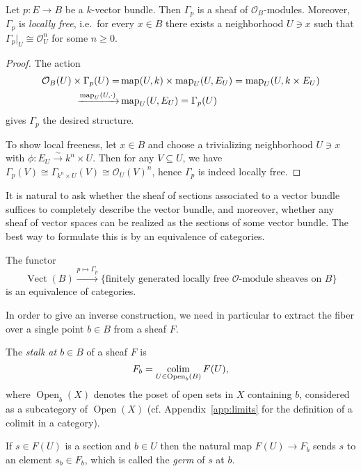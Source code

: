 \documentclass[a4paper,openany]{scrbook}
\DeclareMathOperator{\Vect}{Vect}
\DeclareMathOperator{\Open}{Open}
\begin{document}
\begin{prop}
Let $p\colon E \to B$ be a $k$-vector bundle. Then $\Gamma_p$ is a sheaf of $\mathcal O_B$-modules. Moreover, $\Gamma_p$ is \emph{locally free}, i.e.\  for every $x \in B$ there exists a neighborhood $U \ni x$ such that $\Gamma_p|_U \cong \mathcal O_U^n$ for some $n \geq 0$.
\end{prop}
\begin{proof}
The action
\begin{align*}
\mathcal O_B(U) \times \Gamma_p(U) =& \operatorname{map}(U,k) \times \operatorname{map}_U(U,E_U) = \operatorname{map}_U(U,k\times E_U)\\
\xrightarrow{\operatorname{map}_U(U,\cdot)} &\operatorname{map}_U(U,E_U) = \Gamma_p(U)
\end{align*}
gives $\Gamma_p$ the desired structure.

To show local freeness, let $x \in B$ and choose a trivializing neighborhood $U \ni x$ with $\phi\colon E_U \xrightarrow{\sim} k^n \times U$. Then for any $V \subseteq U$, we have $\Gamma_p(V) \cong \Gamma_{k^n \times U}(V) \cong \mathcal O_U(V)^n$, hence $\Gamma_p$ is indeed locally free.
\end{proof}

It is natural to ask whether the sheaf of sections associated to a vector bundle suffices to completely describe the vector bundle, and moreover, whether any sheaf of vector spaces can be realized as the sections of some vector bundle. The best way to formulate this is by an equivalence of categories.

\begin{thm}\label{thm:vbsheafequivalence}
The functor
\[
\Vect(B) \xrightarrow{p \mapsto \Gamma_p} \{\text{finitely generated locally free $\mathcal O$-module sheaves on $B$}\}
\]
is an equivalence of categories.
\end{thm}

In order to give an inverse construction, we need in particular to extract the fiber over a single point $b \in B$ from a sheaf $F$.

\begin{defn}
The \emph{stalk at $b \in B$} of a sheaf $F$ is
\[
F_b = \colim_{U \in \Open_b(B)} F(U),
\]
where $\Open_b(X)$ denotes the poset of open sets in $X$ containing $b$, considered as a subcategory of $\Open(X)$ (cf. Appendix~\ref{app:limits} for the definition of a colimit in a category).

If $s \in F(U)$ is a section and $b \in U$ then the natural map $F(U) \to F_b$ sends $s$ to an element $s_b \in F_b$, which is called the \emph{germ} of $s$ at $b$.
\end{defn}
\end{document}
